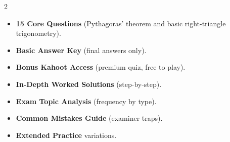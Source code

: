 \documentclass[11pt,a4paper]{article}
\newcommand{\FullReleaseDate}{April 30, 2026}
\begin{document}
\vspace{8pt}

\begin{multicols}{2}
  \begin{tcolorbox}[card, title=\sffamily\bfseries\textcolor{white}{\faHandPointDown\ TODAY (Simplified Version)}, colbacktitle=mainblue, boxed title style={sharp corners, boxrule=0pt}]
    \begin{itemize}[leftmargin=1.2em, itemsep=2pt]
      \item \small \textbf{15 Core Questions} (Pythagoras' theorem and basic right-triangle trigonometry).
      \item \small \textbf{Basic Answer Key} (final answers only).
      \item \small \textbf{Bonus Kahoot Access} (premium quiz, free to play).
    \end{itemize}
  \end{tcolorbox}

  \columnbreak

  \begin{tcolorbox}[card, title=\sffamily\bfseries\textcolor{white}{\faRocket\ ON \FullReleaseDate\ (Full Upgrade)}, colbacktitle=mainblue, boxed title style={sharp corners, boxrule=0pt}]
    \begin{itemize}[leftmargin=1.2em, itemsep=2pt]
      \item \small \textbf{In-Depth Worked Solutions} (step-by-step).
      \item \small \textbf{Exam Topic Analysis} (frequency by type).
      \item \small \textbf{Common Mistakes Guide} (examiner traps).
      \item \small \textbf{Extended Practice} variations.
    \end{itemize}
  \end{tcolorbox}
\end{multicols}
\end{document}
